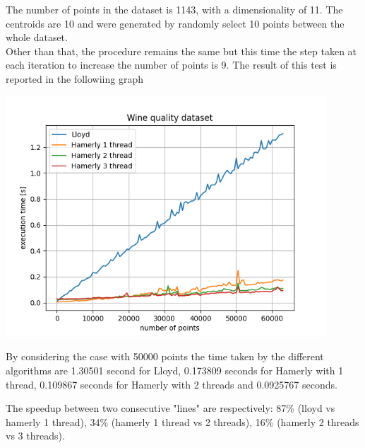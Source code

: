 \documentclass{report}
\begin{document}
\begin{minipage}[b]{0.48\textwidth}
  The number of points in the dataset is 1143, with a dimensionality of 11. The centroids are 10 and were generated by randomly select 10 points between the whole dataset.\\

  Other than that, the procedure remains the same but this time the step taken at each iteration to increase the number of points is 9. The result of this test is reported in the followiing graph

  \begin{center} 
    \includegraphics[width = 0.9\textwidth]{imgs/lh123_wine.png}
    \label{fig:lh123_wine}
  \end{center}
\end{minipage}

\newpage

\begin{minipage}[b]{0.48\textwidth}
  By considering the case with 50000 points the time taken by the different algorithms are 1.30501 second for Lloyd, 0.173809 seconds for Hamerly with 1 thread, 0.109867 seconds for Hamerly with 2 threads and 0.0925767 seconds.

  The speedup between two consecutive "lines" are respectively: 87\% (lloyd vs hamerly 1 thread), 34\% (hamerly 1 thread vs 2 threads), 16\% (hamerly 2 threads vs 3 threads).
\end{minipage}
\hspace{0.1in}
\begin{minipage}[b]{0.48\textwidth}
\end{minipage}
\end{document}
